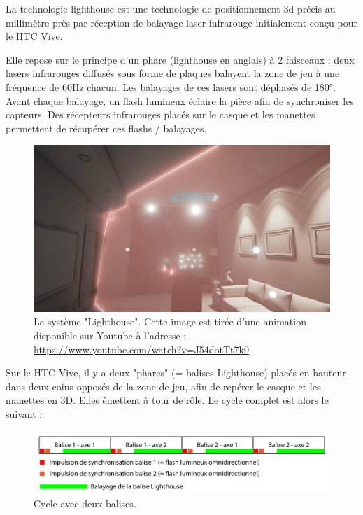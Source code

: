 ﻿La technologie lighthouse est une technologie de positionnement 3d précis au millimètre près par réception de balayage laser infrarouge initialement conçu pour le HTC Vive.

Elle repose sur le principe d'un phare (lighthouse en anglais) à 2 faisceaux : deux lasers infrarouges diffusés sous forme de plaques balayent la zone de jeu à une fréquence de 60Hz chacun. Les balayages de ces lasers sont déphasés de 180°. Avant chaque balayage, un flash lumineux éclaire la pièce afin de synchroniser les capteurs. Des récepteurs infrarouges placés sur le casque et les manettes permettent de récupérer ces flashs / balayages.

\begin{figure}[ht]
\begin{center}
\includegraphics[scale=0.4]{imgs/animation_lighthouse.png}
\end{center}
\caption{Le système "Lighthouse". Cette image est tirée d'une animation disponible sur Youtube à l'adresse : \url{https://www.youtube.com/watch?v=J54dotTt7k0}}
\end{figure}

Sur le HTC Vive, il y a deux "phares" (= balises Lighthouse) placés en hauteur dans deux coins opposés de la zone de jeu, afin de repérer le casque et les manettes en 3D. Elles émettent à tour de rôle. Le cycle complet est alors le suivant :

\begin{figure}[H]
\begin{center}
\includegraphics[scale=0.8]{imgs/cycle_balises_lighthouse_deux_balises.png}
\end{center}
\caption{Cycle avec deux balises.}
\end{figure}

